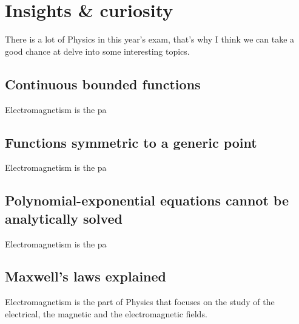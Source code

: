 \chapter[Insights \& curiosity]{Insights \& curiosity}
\label{ch:insights}
There is a lot of Physics in this year's exam, that's why I think we can
take a good chance at delve into some interesting topics.

\section{Continuous bounded functions}
\label{sec:contbound}
Electromagnetism is the pa

\section{Functions symmetric to a generic point}
\label{sec:fsymmcentre}
Electromagnetism is the pa

\section{Polynomial-exponential equations cannot be analytically solved}
\label{sec:polyexpeqimp}
Electromagnetism is the pa

\section{Maxwell's laws explained}
\label{sec:maxwell}
Electromagnetism is the part of Physics that focuses on the study of the
electrical, the magnetic and the electromagnetic fields.
